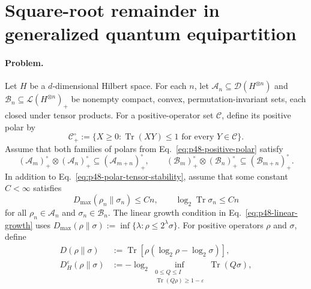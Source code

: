 \section{Square-root remainder in generalized quantum equipartition}
\label{sec:op_eb5ca2d40deb7a38}

\paragraph{Problem.}
Let $H$ be a $d$-dimensional Hilbert space.  For each $n$, let
$\mathcal A_n\subseteq\mathcal D(H^{\otimes n})$ and
$\mathcal B_n\subseteq\mathcal L(H^{\otimes n})_+$ be nonempty compact,
convex, permutation-invariant sets, each closed under tensor products.  For a
positive-operator set $\mathcal C$, define its positive polar by
\begin{equation}
  \mathcal C_+^\circ
  :=\{X\geq0:\operatorname{Tr}(XY)\leq1
      \text{ for every }Y\in\mathcal C\}.
  \label{eq:p48-positive-polar}
\end{equation}
Assume that both families of polars from
Eq.~\eqref{eq:p48-positive-polar} satisfy
\begin{equation}
  (\mathcal A_m)_+^\circ\otimes(\mathcal A_n)_+^\circ
    \subseteq(\mathcal A_{m+n})_+^\circ,
  \qquad
  (\mathcal B_m)_+^\circ\otimes(\mathcal B_n)_+^\circ
    \subseteq(\mathcal B_{m+n})_+^\circ.
  \label{eq:p48-polar-tensor-stability}
\end{equation}
In addition to Eq.~\eqref{eq:p48-polar-tensor-stability}, assume that some
constant $C<\infty$ satisfies
\begin{equation}
  D_{\max}(\rho_n\|\sigma_n)\leq Cn,
  \qquad \log_2\operatorname{Tr}\sigma_n\leq Cn
  \label{eq:p48-linear-growth}
\end{equation}
for all $\rho_n\in\mathcal A_n$ and $\sigma_n\in\mathcal B_n$.  The linear
growth condition in Eq.~\eqref{eq:p48-linear-growth} uses
$D_{\max}(\rho\|\sigma):=\inf\{\lambda:\rho\leq2^\lambda\sigma\}$.
For positive operators $\rho$ and $\sigma$, define
\begin{equation}
  \begin{aligned}
  D(\rho\|\sigma)
    &:=\operatorname{Tr}[\rho(\log_2\rho-\log_2\sigma)],\\
  D_H^\varepsilon(\rho\|\sigma)
    &:=-\log_2\inf_{\substack{0\leq Q\leq I\\
                    \operatorname{Tr}(Q\rho)\geq1-\varepsilon}}
                    \operatorname{Tr}(Q\sigma),
  \end{aligned}
  \label{eq:p48-state-divergences}
\end{equation}
